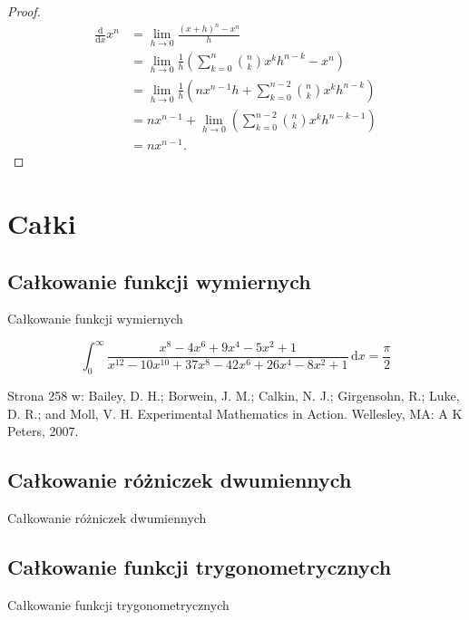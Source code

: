 \documentclass{parchment}
\begin{document}
\begin{proof}
\begin{align}
    \frac{\mathrm{d}}{\mathrm{d}x} x^n
    & = \lim_{h \to 0} \frac{(x+h)^n - x^n}{h} \\
    & = \lim_{h \to 0} \frac{1}{h} \left(\sum_{k=0}^n {n \choose k} x^k h^{n-k} - x^n \right) \\
    & = \lim_{h \to 0} \frac{1}{h} \left(nx^{n-1}h + \sum_{k=0}^{n-2} {n \choose k} x^k h^{n-k}\right) \\
    & = nx^{n-1} + \lim_{h \to 0} \left(\sum_{k=0}^{n-2} {n \choose k} x^k h^{n-k-1}\right) \\
    & = nx^{n-1}.
\end{align}
\end{proof}

\chapter{Całki}




\section{Całkowanie funkcji wymiernych}
Całkowanie funkcji wymiernych

\begin{integral}
\begin{equation}
    \int_0^\infty \frac{x^8-4x^6+9x^4-5x^2+1}{x^{12}-10x^{10}+37x^8-42x^6+26x^4-8x^2+1} \,\mathrm{d}x = \frac{\pi}{2}
\end{equation}
\end{integral}

\begin{solution}
    Strona 258 w: Bailey, D. H.; Borwein, J. M.; Calkin, N. J.; Girgensohn, R.; Luke, D. R.; and Moll, V. H. Experimental Mathematics in Action. Wellesley, MA: A K Peters, 2007.
\end{solution}

\section{Całkowanie różniczek dwumiennych}
Całkowanie różniczek dwumiennych

\section{Całkowanie funkcji trygonometrycznych}
Całkowanie funkcji trygonometrycznych


\end{document}

